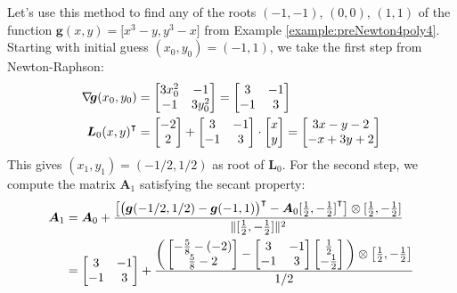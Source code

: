 \begin{example}\label{example:SecantPoly4}
Let's use this method to find any of the roots $(-1,-1)$, $(0,0)$, $(1,1)$ of the function $\boldsymbol{g}(x,y) = \big[ x^3-y, y^3 - x \big]$ from Example \ref{example:preNewton4poly4}.
Starting with initial guess $(x_0, y_0) = (-1, 1)$, we take the first step from Newton-Raphson:
\begin{align*}
\mathop{\nabla\! {\boldsymbol{g}}}(x_0, y_0) &= \begin{bmatrix} 3x_0^2 & -1 \\ -1 & 3y_0^2 \end{bmatrix} =  \begin{bmatrix} 3 & -1 \\ -1 & 3 \end{bmatrix} \\
{\boldsymbol{L}_0 (x, y)}^\intercal &= \begin{bmatrix} -2 \\ 2 \end{bmatrix} + \begin{bmatrix} 3 & -1 \\ -1 & 3 \end{bmatrix} \cdot \begin{bmatrix} x \\ y \end{bmatrix} = \begin{bmatrix} 3x -y -2 \\ -x+3y +2 \end{bmatrix}
\end{align*}
This gives $(x_1, y_1) = (-1/2, 1/2)$ as root of $\boldsymbol{L}_0$.  For the second step, we compute the matrix $\boldsymbol{A}_1$ satisfying the secant property:
\begin{align*}
\boldsymbol{A}_1 &= \boldsymbol{A}_0 + \frac{\big[ \transpose{\big(\boldsymbol{g}(-1/2,1/2)-\boldsymbol{g}(-1,1)\big)} - \boldsymbol{A}_0 \transpose{[\tfrac{1}{2},-\tfrac{1}{2}]} \big] \otimes [\tfrac{1}{2},-\tfrac{1}{2}]}{\norm{[\tfrac{1}{2},-\tfrac{1}{2}]}^2} \\
&= \begin{bmatrix} 3 & -1 \\ -1 & 3 \end{bmatrix} + \frac{\bigg( \begin{bmatrix} -\tfrac{5}{8} -(-2) \\ \tfrac{5}{8}-2 \end{bmatrix} - \begin{bmatrix} 3 & -1 \\ -1 & 3 \end{bmatrix} \begin{bmatrix} \tfrac{1}{2} \\ -\tfrac{1}{2} \end{bmatrix} \bigg) \otimes \big[ \tfrac{1}{2}, -\tfrac{1}{2} \big]}{1/2} \\

\end{align*}
\end{example}
